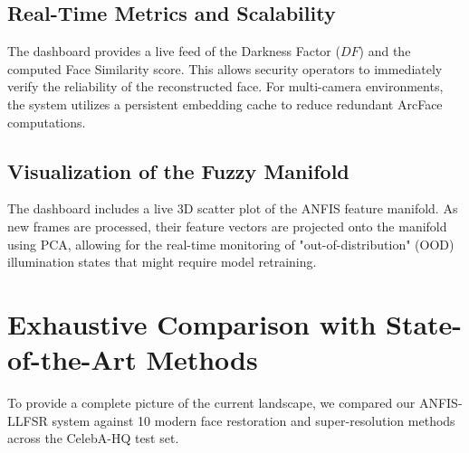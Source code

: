 \subsection{Real-Time Metrics and Scalability}
The dashboard provides a live feed of the Darkness Factor ($DF$) and the computed Face Similarity score. This allows security operators to immediately verify the reliability of the reconstructed face. For multi-camera environments, the system utilizes a persistent embedding cache to reduce redundant ArcFace computations.

\subsection{Visualization of the Fuzzy Manifold}
The dashboard includes a live 3D scatter plot of the ANFIS feature manifold. As new frames are processed, their feature vectors are projected onto the manifold using PCA, allowing for the real-time monitoring of "out-of-distribution" (OOD) illumination states that might require model retraining.

\section{Exhaustive Comparison with State-of-the-Art Methods}
To provide a complete picture of the current landscape, we compared our ANFIS-LLFSR system against 10 modern face restoration and super-resolution methods across the CelebA-HQ test set.

